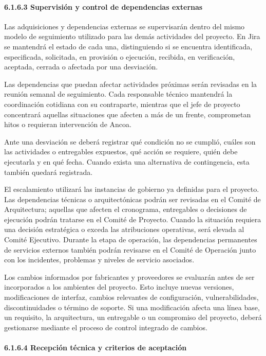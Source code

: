 \documentclass[11pt]{article}
\begin{document}
\paragraph{6.1.6.3 Supervisión y control de dependencias externas}\label{6-1-6-3-supervision-y-control-de-dependencias-externas}

Las adquisiciones y dependencias externas se supervisarán dentro del mismo modelo de seguimiento utilizado para las demás actividades del proyecto. En Jira se mantendrá el estado de cada una, distinguiendo si se encuentra identificada, especificada, solicitada, en provisión o ejecución, recibida, en verificación, aceptada, cerrada o afectada por una desviación.

Las dependencias que puedan afectar actividades próximas serán revisadas
en la reunión semanal de seguimiento. Cada responsable técnico mantendrá
la coordinación cotidiana con su contraparte, mientras que el jefe de
proyecto concentrará aquellas situaciones que afecten a más de un
frente, comprometan hitos o requieran intervención de Ancoa.

Ante una desviación se deberá registrar qué condición no se cumplió,
cuáles son las actividades o entregables expuestos, qué acción se
requiere, quién debe ejecutarla y en qué fecha. Cuando exista una
alternativa de contingencia, esta también quedará registrada.

El escalamiento utilizará las instancias de gobierno ya definidas para
el proyecto. Las dependencias técnicas o arquitectónicas podrán ser
revisadas en el Comité de Arquitectura; aquellas que afecten el
cronograma, entregables o decisiones de ejecución podrán tratarse en el
Comité de Proyecto. Cuando la situación requiera una decisión
estratégica o exceda las atribuciones operativas, será elevada al Comité
Ejecutivo. Durante la etapa de operación, las dependencias permanentes
de servicios externos también podrán revisarse en el Comité de Operación
junto con los incidentes, problemas y niveles de servicio asociados.

Los cambios informados por fabricantes y proveedores se evaluarán antes
de ser incorporados a los ambientes del proyecto. Esto incluye nuevas
versiones, modificaciones de interfaz, cambios relevantes de
configuración, vulnerabilidades, discontinuidades o término de soporte.
Si una modificación afecta una línea base, un requisito, la
arquitectura, un entregable o un compromiso del proyecto, deberá
gestionarse mediante el proceso de control integrado de cambios.

\paragraph{6.1.6.4 Recepción técnica y criterios de aceptación}\label{6-1-6-4-recepcion-tecnica-y-criterios-de-aceptacion}
\end{document}
